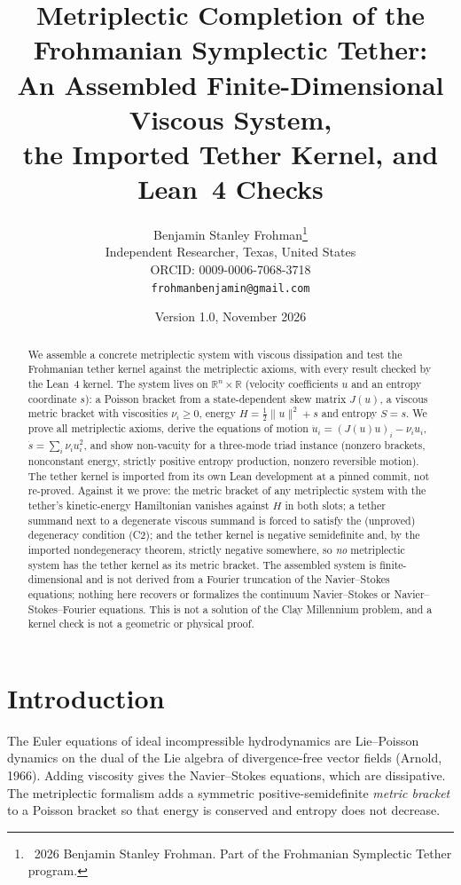 \documentclass[11pt,a4paper]{article}
\title{\textbf{Metriplectic Completion of the Frohmanian Symplectic Tether:\\
An Assembled Finite-Dimensional Viscous System,\\ the Imported Tether Kernel, and Lean~4 Checks}}
\author{Benjamin Stanley Frohman\thanks{\textcopyright\ 2026 Benjamin Stanley Frohman. Part of the Frohmanian Symplectic Tether program.}\\
Independent Researcher, Texas, United States\\
ORCID: 0009-0006-7068-3718\\
\texttt{frohmanbenjamin@gmail.com}}
\date{Version 1.0, November 2026}
\begin{document}
\maketitle

\begin{abstract}
We assemble a concrete metriplectic system with viscous dissipation and test the Frohmanian tether
kernel against the metriplectic axioms, with every result checked by the Lean~4 kernel. The system
lives on \(\mathbb{R}^n\times\mathbb{R}\) (velocity coefficients \(u\) and an entropy coordinate \(s\)): a Poisson
bracket from a state-dependent skew matrix \(J(u)\), a viscous metric bracket with viscosities
\(\nu_i\ge0\), energy \(H=\tfrac12\|u\|^2+s\) and entropy \(S=s\). We prove all metriplectic axioms, derive the
equations of motion \(\dot u_i=(J(u)u)_i-\nu_iu_i\), \(\dot s=\sum_i\nu_iu_i^2\), and show non-vacuity for a
three-mode triad instance (nonzero brackets, nonconstant energy, strictly positive entropy production,
nonzero reversible motion). The tether kernel is imported from its own Lean development at a pinned
commit, not re-proved. Against it we prove: the metric bracket of any metriplectic system with the
tether's kinetic-energy Hamiltonian vanishes against \(H\) in both slots; a tether summand next to a
degenerate viscous summand is forced to satisfy the (unproved) degeneracy condition (C2); and the tether
kernel is negative semidefinite and, by the imported nondegeneracy theorem, strictly negative
somewhere, so \emph{no} metriplectic system has the tether kernel as its metric bracket. The assembled
system is finite-dimensional and is not derived from a Fourier truncation of the Navier--Stokes
equations; nothing here recovers or formalizes the continuum Navier--Stokes or Navier--Stokes--Fourier
equations. This is not a solution of the Clay Millennium problem, and a kernel check is not a
geometric or physical proof.
\end{abstract}

\tableofcontents

\section{Introduction}
The Euler equations of ideal incompressible hydrodynamics are Lie--Poisson dynamics on the dual of
the Lie algebra of divergence-free vector fields (Arnold, 1966). Adding viscosity gives the
Navier--Stokes equations, which are dissipative. The metriplectic formalism
\cite{Morrison1986,MorrisonUpdike2024} adds a symmetric positive-semidefinite \emph{metric bracket}
to a Poisson bracket so that energy is conserved and entropy does not decrease.
\end{document}
